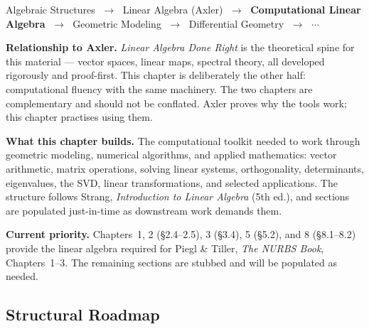 
\begin{tcolorbox}[
  colback=gray!6,
  colframe=gray!40,
  arc=2pt,
  left=8pt, right=8pt, top=6pt, bottom=6pt,
  title={\small\textbf{Where You Are in the Journey}},
  fonttitle=\small\bfseries
]
\begin{center}
\small
Algebraic Structures
$\;\to\;$ Linear Algebra (Axler)
$\;\to\;$ \textbf{Computational Linear Algebra}
$\;\to\;$ Geometric Modeling
$\;\to\;$ Differential Geometry
$\;\to\;$ $\cdots$
\end{center}

\medskip
\noindent\textbf{Relationship to Axler.}
\textit{Linear Algebra Done Right} is the theoretical spine for this
material --- vector spaces, linear maps, spectral theory, all developed
rigorously and proof-first.
This chapter is deliberately the other half: computational fluency
with the same machinery.
The two chapters are complementary and should not be conflated.
Axler proves why the tools work; this chapter practises using them.

\medskip
\noindent\textbf{What this chapter builds.}
The computational toolkit needed to work through geometric modeling,
numerical algorithms, and applied mathematics: vector arithmetic,
matrix operations, solving linear systems, orthogonality, determinants,
eigenvalues, the SVD, linear transformations, and selected applications.
The structure follows Strang, \textit{Introduction to Linear Algebra}
(5th ed.), and sections are populated just-in-time as downstream work
demands them.

\medskip
\noindent\textbf{Current priority.}
Chapters~1, 2 (§2.4--2.5), 3 (§3.4), 5 (§5.2), and 8 (§8.1--8.2)
provide the linear algebra required for Piegl \& Tiller,
\textit{The NURBS Book}, Chapters~1--3.
The remaining sections are stubbed and will be populated as needed.
\end{tcolorbox}
\vspace{1em}

\subsection*{Structural Roadmap}

